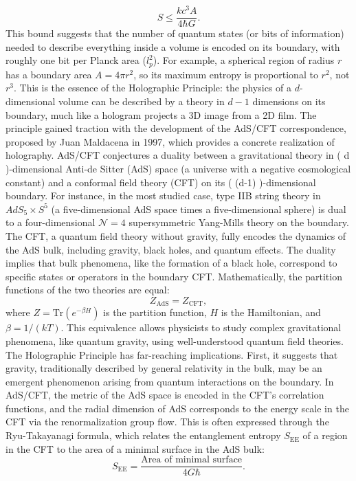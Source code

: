 $$ S \leq \frac{k c^3 A}{4 \hbar G}. $$
This bound suggests that the number of quantum states (or bits of information) needed to describe everything inside a volume is encoded on its boundary, with roughly one bit per Planck area (\( l_p^2 \)). For example, a spherical region of radius \( r \) has a boundary area \( A = 4\pi r^2 \), so its maximum entropy is proportional to \( r^2 \), not \( r^3 \). This is the essence of the Holographic Principle: the physics of a \( d \)-dimensional volume can be described by a theory in \( d-1 \) dimensions on its boundary, much like a hologram projects a 3D image from a 2D film.
The principle gained traction with the development of the AdS/CFT correspondence, proposed by Juan Maldacena in 1997, which provides a concrete realization of holography. AdS/CFT conjectures a duality between a gravitational theory in ( d )-dimensional Anti-de Sitter (AdS) space (a universe with a negative cosmological constant) and a conformal field theory (CFT) on its ( (d-1) )-dimensional boundary. For instance, in the most studied case, type IIB string theory in \( AdS_5 \times S^5 \) (a five-dimensional AdS space times a five-dimensional sphere) is dual to a four-dimensional \( \mathcal{N}=4 \) supersymmetric Yang-Mills theory on the boundary. The CFT, a quantum field theory without gravity, fully encodes the dynamics of the AdS bulk, including gravity, black holes, and quantum effects. The duality implies that bulk phenomena, like the formation of a black hole, correspond to specific states or operators in the boundary CFT. Mathematically, the partition functions of the two theories are equal:
$$ Z_{\text{AdS}} = Z_{\text{CFT}}, $$
where \( Z = \text{Tr}(e^{-\beta H}) \) is the partition function, \( H \) is the Hamiltonian, and \( \beta = 1/(k T) \). This equivalence allows physicists to study complex gravitational phenomena, like quantum gravity, using well-understood quantum field theories.
The Holographic Principle has far-reaching implications. First, it suggests that gravity, traditionally described by general relativity in the bulk, may be an emergent phenomenon arising from quantum interactions on the boundary. In AdS/CFT, the metric of the AdS space is encoded in the CFT’s correlation functions, and the radial dimension of AdS corresponds to the energy scale in the CFT via the renormalization group flow. This is often expressed through the Ryu-Takayanagi formula, which relates the entanglement entropy \( S_{\text{EE}} \) of a region in the CFT to the area of a minimal surface in the AdS bulk:
$$ S_{\text{EE}} = \frac{\text{Area of minimal surface}}{4 G \hbar}. $$
